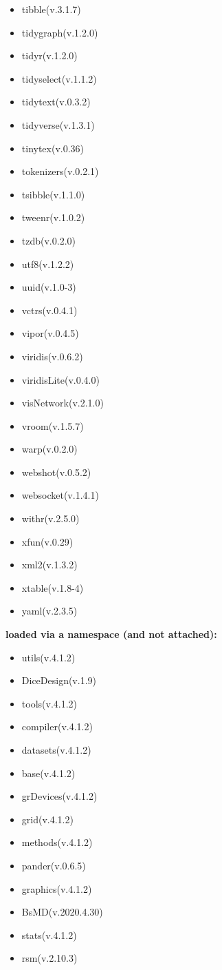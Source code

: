 \documentclass[
]{article}
\providecommand{\tightlist}{%
  \setlength{\itemsep}{0pt}\setlength{\parskip}{0pt}}
\begin{document}
\begin{itemize}
\item
  tibble(v.3.1.7)
\item
  tidygraph(v.1.2.0)
\item
  tidyr(v.1.2.0)
\item
  tidyselect(v.1.1.2)
\item
  tidytext(v.0.3.2)
\item
  tidyverse(v.1.3.1)
\item
  tinytex(v.0.36)
\item
  tokenizers(v.0.2.1)
\item
  tsibble(v.1.1.0)
\item
  tweenr(v.1.0.2)
\item
  tzdb(v.0.2.0)
\item
  utf8(v.1.2.2)
\item
  uuid(v.1.0-3)
\item
  vctrs(v.0.4.1)
\item
  vipor(v.0.4.5)
\item
  viridis(v.0.6.2)
\item
  viridisLite(v.0.4.0)
\item
  visNetwork(v.2.1.0)
\item
  vroom(v.1.5.7)
\item
  warp(v.0.2.0)
\item
  webshot(v.0.5.2)
\item
  websocket(v.1.4.1)
\item
  withr(v.2.5.0)
\item
  xfun(v.0.29)
\item
  xml2(v.1.3.2)
\item
  xtable(v.1.8-4)
\item
  yaml(v.2.3.5)
\end{itemize}

\textbf{loaded via a namespace (and not attached):}

\begin{itemize}
\tightlist
\item
  utils(v.4.1.2)
\item
  DiceDesign(v.1.9)
\item
  tools(v.4.1.2)
\item
  compiler(v.4.1.2)
\item
  datasets(v.4.1.2)
\item
  base(v.4.1.2)
\item
  grDevices(v.4.1.2)
\item
  grid(v.4.1.2)
\item
  methods(v.4.1.2)
\item
  pander(v.0.6.5)
\item
  graphics(v.4.1.2)
\item
  BsMD(v.2020.4.30)
\item
  stats(v.4.1.2)
\item
  rsm(v.2.10.3)
\end{itemize}

\printbibliography
\end{document}
